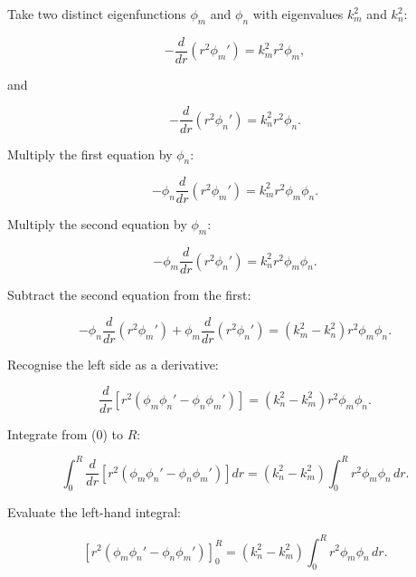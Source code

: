 \documentclass[11pt,a4paper]{article}
\begin{document}
Take two distinct eigenfunctions $\phi_m$ and $\phi_n$ with eigenvalues $k_m^2$ and $k_n^2$:

\begin{equation}
-\frac{d}{dr}
(r^2\phi_m')
=
k_m^2r^2\phi_m,
\tag{TRISO-SL-210}
\label{eq:triso-sl-210}
\end{equation}

and

\begin{equation}
-\frac{d}{dr}
(r^2\phi_n')
=
k_n^2r^2\phi_n.
\tag{TRISO-SL-211}
\label{eq:triso-sl-211}
\end{equation}

Multiply the first equation by $\phi_n$:

\begin{equation}
-\phi_n\frac{d}{dr}(r^2\phi_m')
=
k_m^2r^2\phi_m\phi_n.
\tag{TRISO-SL-212}
\label{eq:triso-sl-212}
\end{equation}

Multiply the second equation by $\phi_m$:

\begin{equation}
-\phi_m\frac{d}{dr}(r^2\phi_n')
=
k_n^2r^2\phi_m\phi_n.
\tag{TRISO-SL-213}
\label{eq:triso-sl-213}
\end{equation}

Subtract the second equation from the first:

\begin{equation}
-\phi_n\frac{d}{dr}(r^2\phi_m')
+
\phi_m\frac{d}{dr}(r^2\phi_n')
=
(k_m^2-k_n^2)r^2\phi_m\phi_n.
\tag{TRISO-SL-214}
\label{eq:triso-sl-214}
\end{equation}

Recognise the left side as a derivative:

\begin{equation}
\frac{d}{dr}
\left[
r^2
(
\phi_m\phi_n'
-
\phi_n\phi_m'
)
\right]
=
(k_n^2-k_m^2)r^2\phi_m\phi_n.
\tag{TRISO-SL-215}
\label{eq:triso-sl-215}
\end{equation}

Integrate from (0) to $R$:

\begin{equation}
\int_0^R
\frac{d}{dr}
\left[
r^2
(
\phi_m\phi_n'
-
\phi_n\phi_m'
)
\right]dr
=
(k_n^2-k_m^2)
\int_0^R
r^2\phi_m\phi_n\,dr.
\tag{TRISO-SL-216}
\label{eq:triso-sl-216}
\end{equation}

Evaluate the left-hand integral:

\begin{equation}
\left[
r^2
(
\phi_m\phi_n'
-
\phi_n\phi_m'
)
\right]_0^R
=
(k_n^2-k_m^2)
\int_0^R
r^2\phi_m\phi_n\,dr.
\tag{TRISO-SL-217}
\label{eq:triso-sl-217}
\end{equation}
\end{document}
